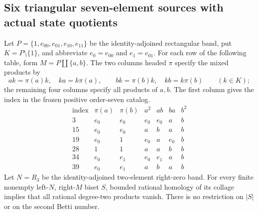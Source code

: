 \subsection{Six triangular seven-element sources with actual state quotients}

\begin{theorem}
\label{CP2:A-seven-triangular-family-right-zero}
Let $P=\{1,e_{00},e_{01},e_{10},e_{11}\}$ be the
identity-adjoined rectangular band, put $K=P\setminus\{1\}$,
and abbreviate $e_0=e_{00}$ and $e_1=e_{01}$.
For each row of the following table, form $M=P\amalg\{a,b\}$.
The two columns headed $\pi$ specify the mixed products by
\[
 ak=\pi(a)k,\quad ka=k\pi(a),\qquad
 bk=\pi(b)k,\quad kb=k\pi(b)\qquad(k\in K);
\]
the remaining four columns specify all products of $a,b$.
The first column gives the index in the frozen positive
order-seven catalog.
\[
\begin{array}{c|cc|cccc}
\text{index}&\pi(a)&\pi(b)&a^2&ab&ba&b^2\\\hline
3&e_0&e_0&e_0&e_0&a&b\\
15&e_0&e_0&a&b&a&b\\
19&e_0&1&e_0&a&e_0&b\\
28&1&1&a&a&b&b\\
34&e_0&e_1&e_0&e_1&a&b\\
39&e_0&e_1&a&b&a&b
\end{array}
\]
Let $N=R_3$ be the identity-adjoined two-element right-zero
band.  For every finite nonempty left-$N$, right-$M$ biset
$S$, bounded rational homology of its collage implies that
all rational degree-two products vanish.  There is no
restriction on $|S|$ or on the second Betti number.
\end{theorem}
